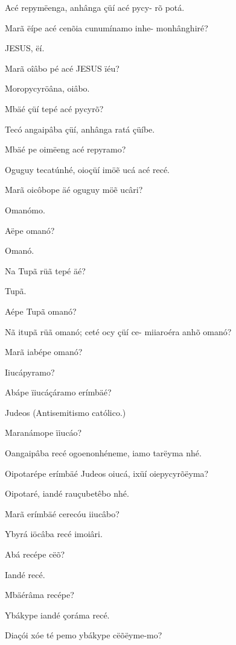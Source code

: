 \documentclass[openany,titlepage,12pt]{book}
\begin{document}
\begin{altereven}
    \item Acé repymëenga, anhânga çüí acé pycy-
    rõ potá.
    \item Marã ëípe acé cenõia cunumínamo inhe-
    monhânghiré?
    \item JESUS, ëí.
    \item Marã oîâbo pé acé JESUS ïéu?
    \item Moropycyröâna, oiâbo.
    \item Mbäé çüí tepé acé pycyrõ?
    \item Tecó angaipâba çüí, anhânga ratá çüíbe.
    \item Mbäé pe oimëeng acé repyramo?
    \item Oguguy tecatúnhé, oioçüí imö\~e ucá acé
    recé.
    \item Marã oicôbope äé oguguy mö\~e ucâri?
    \item Omanómo.
    \item Aëpe omanó?
    \item Omanó.
    \item Na Tupã rüã tepé äé?
    \item Tupã.
    \item Aépe Tupã omanó?
    \item Nã itupã rüã omanó; ceté ocy çüí ce-\linebreak
    miiaroéra anhõ omanó?
    \item Marã iabépe omanó?
    \item Iiucápyramo?
    \item Abápe ïiucáçáramo erímbäé?
    \item Judeos (Antisemitismo católico.)
    \item Maranámope ïiucáo?
    \item Oangaipâba recé ogoenonhéneme, iamo
    tarëyma nhé.
    \item Oipotarépe erímbäé Judeos oiucá, ixüí
    oiepycyrõëyma?
    \item Oipotaré, iandé rauçubetêbo nhé.
    \item Marã erímbäé cerecóu iiucâbo?
    \item Ybyrá iöcâba recé imoiâri.
    \item Abá recépe cëõ?
    \item Iandé recé.
    \item Mbäérâma recépe?
    \item Ybákype iandé çoráma recé.
    \item Diaçói xóe té pemo ybákype cëõëyme-mo?

\end{altereven}
\end{document}
